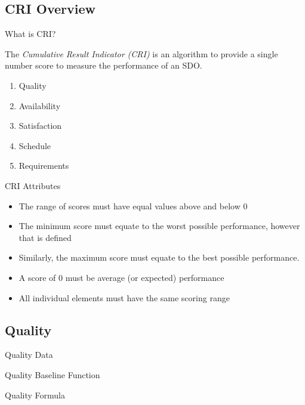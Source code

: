     \subsection{CRI Overview}
        \begin{frame}{What is CRI?}
            \begin{displayquote}
                The \textit{Cumulative Result Indicator (CRI)} is an algorithm to provide a single 
                number score to measure the performance of an SDO. 
            \end{displayquote}
            \begin{enumerate}
                \item Quality
                \item Availability
                \item Satisfaction
                \item Schedule
                \item Requirements
            \end{enumerate}
        \end{frame} 
        
        \begin{frame}{CRI Attributes}
            \begin{itemize}
                \item The range of scores must have equal values above and below 0
                \item The minimum score must equate to the worst possible 
                    performance, however that is defined
                \item Similarly, the maximum score must equate to the best possible performance.  
                \item A score of 0 must be average (or expected) performance
                \item All individual elements must have the same scoring range
            \end{itemize}
        \end{frame} 
        
    \subsection{Quality}
        \begin{frame}{Quality Data}
        \end{frame} 
        \begin{frame}{Quality Baseline Function}
        \end{frame} 
        \begin{frame}{Quality Formula}
        \end{frame} 
